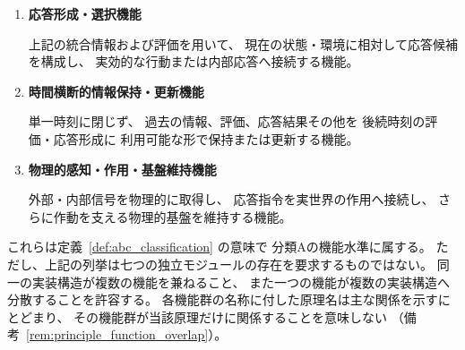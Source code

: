 \begin{definition}
\begin{enumerate}
  \item
  \textbf{応答形成・選択機能}

  上記の統合情報および評価を用いて、
  現在の状態・環境に相対して応答候補を構成し、
  実効的な行動または内部応答へ接続する機能。

  \item
  \textbf{時間横断的情報保持・更新機能}

  単一時刻に閉じず、
  過去の情報、評価、応答結果その他を
  後続時刻の評価・応答形成に
  利用可能な形で保持または更新する機能。

  \item
  \textbf{物理的感知・作用・基盤維持機能}

  外部・内部信号を物理的に取得し、
  応答指令を実世界の作用へ接続し、
  さらに作動を支える物理的基盤を維持する機能。

\end{enumerate}

これらは定義~\ref{def:abc_classification} の意味で
分類Aの機能水準に属する。
ただし、上記の列挙は七つの独立モジュールの存在を要求するものではない。
同一の実装構造が複数の機能を兼ねること、
また一つの機能が複数の実装構造へ分散することを許容する。
各機能群の名称に付した原理名は主な関係を示すにとどまり、
その機能群が当該原理だけに関係することを意味しない
（備考~\ref{rem:principle_function_overlap}）。
\end{definition}


